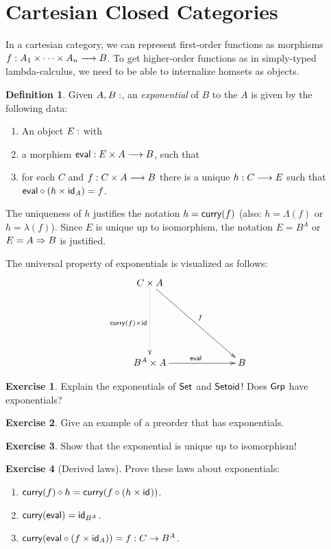\documentclass[a4paper,fleqn]{scrartcl}
\theoremstyle{definition}
\newtheorem{definition}{Definition}
\newtheorem{exercise}{Exercise}
\let\C\relax %
\newcommand{\C}{\mathcal{C}}
\begin{document}
\section{Cartesian Closed Categories}

In a cartesian category, we can represent first-order functions as
morphisms $f : A_1 \times \dots \times A_n \too B$.  To get
higher-order functions as in simply-typed lambda-calculus, we need to
be able to internalize homsets as objects.

\begin{definition}
  Given $A,B : \C$, an \emph{exponential} of $B$ to the $A$ is given
  by the following data:
  \begin{enumerate}
  \item An object $E : \C$ with
  \item a morphism $\teval : E \times A \too B$, such that
  \item for each $C$ and $f : C \times A \too B$ there is a unique $h
    : C \too E$ such that $\teval \comp (h \times \id[A]) = f$.
  \end{enumerate}
  The uniqueness of $h$ justifies the notation $h = \tcurry(f)$ (also:
  $h = \Lambda(f)$ or $h = \lambda(f)$).
  Since $E$ is unique up to isomorphism, the notation $E = B^A$ or $E
  = A \To B$ is justified.
\end{definition}
The universal property of exponentials is visualized as follows:
\[
\xymatrix@=16ex{
  C \times A \ar@{.>}[d]_{\tcurry(f) \times \tid}
      \ar[dr]^{f}\\
  B^A \times A \ar[r]^{\teval} & B \\
}
\]
\begin{exercise}
  Explain the exponentials of $\Set$ and $\Setoid$!
  Does $\Grp$ have exponentials?
\end{exercise}
\begin{exercise}
  Give an example of a preorder that has exponentials.
\end{exercise}
\begin{exercise}
  Show that the exponential is unique up to isomorphism!
\end{exercise}
\begin{exercise}[Derived laws]
   Prove these laws about exponentials:
   \begin{enumerate}
   \item $\tcurry(f) \comp h = \tcurry(f \comp (h \times \id))$.
   \item $\tcurry(\teval) = \id[B^A]$.
   \item $\tcurry(\teval \comp (f \times \id[A])) = f : C \to B^A$.
   \end{enumerate}
\end{exercise}
\end{document}
